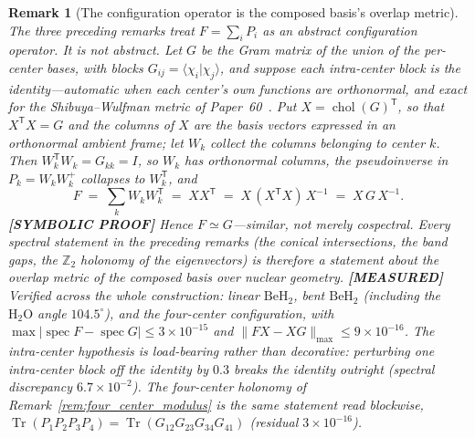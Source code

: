 \documentclass[11pt]{article}
\newtheorem{remark}{Remark}
\begin{document}
\begin{remark}[The configuration operator is the composed basis's overlap metric]
\label{rem:config_operator_is_metric}
The three preceding remarks treat $F = \sum_i P_i$ as an abstract
configuration operator.  It is not abstract.  Let $G$ be the Gram matrix
of the union of the per-center bases, with blocks
$G_{ij} = \langle \chi_i | \chi_j \rangle$, and suppose each
\emph{intra}-center block is the identity---automatic when each center's
own functions are orthonormal, and exact for the Shibuya--Wulfman metric
of Paper~60~\cite{paper60}.  Put $X = \operatorname{chol}(G)^{\mathsf T}$,
so that $X^{\mathsf T} X = G$ and the columns of $X$ are the basis vectors
expressed in an orthonormal ambient frame; let $W_k$ collect the columns
belonging to center $k$.  Then $W_k^{\mathsf T} W_k = G_{kk} = I$, so
$W_k$ has orthonormal columns, the pseudoinverse in $P_k = W_k W_k^{+}$
collapses to $W_k^{\mathsf T}$, and
\[
   F \;=\; \sum_k W_k W_k^{\mathsf T} \;=\; X X^{\mathsf T}
     \;=\; X\,(X^{\mathsf T} X)\,X^{-1} \;=\; X\,G\,X^{-1}.
\]
\textbf{[SYMBOLIC PROOF]} Hence $F \simeq G$---\emph{similar}, not merely cospectral.  Every
spectral statement in the preceding remarks (the conical intersections,
the band gaps, the $\mathbb{Z}_2$ holonomy of the eigenvectors) is
therefore a statement about the \emph{overlap metric of the composed
basis} over nuclear geometry.  \textbf{[MEASURED]} Verified across the whole construction:
linear $\mathrm{BeH_2}$, bent $\mathrm{BeH_2}$ (including the
$\mathrm{H_2O}$ angle $104.5^\circ$), and the four-center configuration,
with $\max|\operatorname{spec} F - \operatorname{spec} G| \le
3\times10^{-15}$ and $\lVert FX - XG \rVert_{\max} \le 9\times10^{-16}$.
The intra-center hypothesis is load-bearing rather than decorative:
perturbing one intra-center block off the identity by $0.3$ breaks the
identity outright (spectral discrepancy $6.7\times10^{-2}$).  The
four-center holonomy of Remark~\ref{rem:four_center_modulus} is the same
statement read blockwise,
$\operatorname{Tr}(P_1P_2P_3P_4) =
\operatorname{Tr}(G_{12}G_{23}G_{34}G_{41})$ (residual
$3\times10^{-16}$).


\end{remark}
\end{document}
